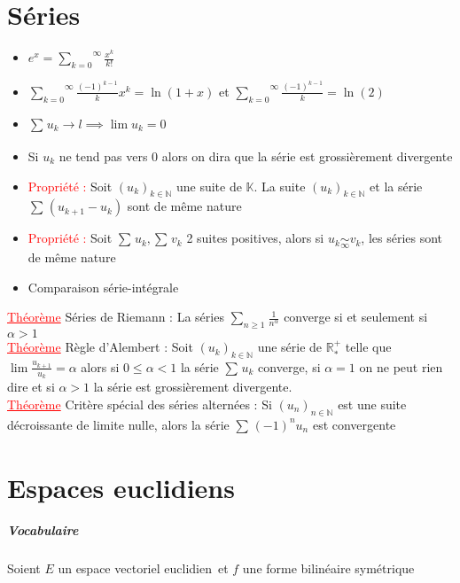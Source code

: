 \documentclass[a4paper, 11pts, french]{article}
\newcommand{\R}{\mathbb{R}}
\newcommand{\N}{\mathbb{N}}
\newcommand{\K}{\mathbb{K}}
\newcommand{\eve}{espace vectoriel euclidien}
\newcommand{\al}{\alpha}
\newcommand{\som}[2]{\overset{#2}{\underset{#1}{\sum}}}
\newcommand{\thm}{\textcolor{red}{\underline{Théorème} }}
\newcommand{\ppt}{\textcolor{red}{Propriété : }}
\newcommand{\limit}[1]{\underset{#1}{\rightarrow}}
\newcommand{\eq}[1]{\underset{#1}{\sim}}
\newcommand{\inv}[1]{\frac{1}{#1}}
\begin{document}
	\section{Séries}
	\begin{itemize}
 		\item $e^x=\som{k=0}{\infty}\frac{x^k}{k!}$
 		\item $\som{k=0}{\infty}\frac{(-1)^{k-1}}{k}x^k=\ln(1+x)$ et $\som{k=0}{\infty}\frac{(-1)^{k-1}}{k}=\ln(2)$
		\item $\som{}{}u_k \limit{}l \implies \lim u_k=0$
		\item Si $u_k$ ne tend pas vers 0 alors on dira que la série est grossièrement divergente
		\item \ppt Soit $(u_k)_{k \in \N}$ une suite de $\K$. La suite $(u_k)_{k \in \N}$ et la série $\som{}{}(u_{k+1}-u_k)$ sont de même nature
		\item \ppt Soit $\som{}{}u_k,\som{}{}v_k$ 2 suites positives, alors si $u_k \eq{\infty} v_k$, les séries sont de même nature
		\item Comparaison série-intégrale
	\end{itemize}
	 \thm Séries de Riemann : La séries $\som{n\geqslant 1}{} \inv{n^\al}$ converge si et seulement si $\al > 1$ \\
	 \thm Règle d'Alembert : Soit $(u_k)_{k \in \N}$ une série de $\R_*^+$ telle que $\lim \frac{u_{k+1}}{u_k}=\al$ alors si $0 \leqslant \al <1$ la série $\som{}{}u_k$ converge, si $\al=1$ on ne peut rien dire et si $\al>1$ la série est grossièrement divergente. \\
	 \thm Critère spécial des séries alternées : Si $(u_n)_{n \in \N}$ est une suite décroissante de limite nulle, alors la série $\som{}{}(-1)^nu_n$ est convergente


	 \section{Espaces euclidiens}
	 
	 \subparagraph{Vocabulaire}
	 
	 Soient \(E\) un \eve \, et $f$ une forme bilinéaire symétrique
	 
\end{document}
